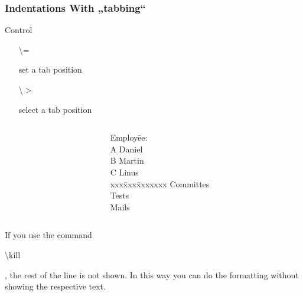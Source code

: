 \begin{frame}
\frametitle{Indentations With „tabbing“}
\begin{block}{Control}
\begin{itemize}
\item[\begin{ttfamily}\color{nounibaredI}\textbackslash =\end{ttfamily}]\color{black}set a tab position 
\item[\begin{ttfamily}\color{nounibaredI}\textbackslash $>$\end{ttfamily}]select a tab position
\end{itemize}
\end{block}

\begin{columns}
\begin{column}{.5\textwidth}
\begin{ttfamily}{\scriptsize
}
\end{ttfamily}
\end{column}
\begin{column}{.5\textwidth}
\begin{tabbing}
Employ\=ee:\\
A  \> Daniel\\
B  \> Martin\\
C  \> Linus\\
xxx\=xxx\=xxxxxxx\kill
\> Committes\\
\>\> Tests\\
\>\> Mails\\
\end{tabbing}
\end{column}
\end{columns}

If you use the command \begin{ttfamily}\color{nounibaredI}\textbackslash kill\color{black}\end{ttfamily}, the rest of the line is not shown. In this way you can do the formatting without showing the respective text.
\end{frame}
